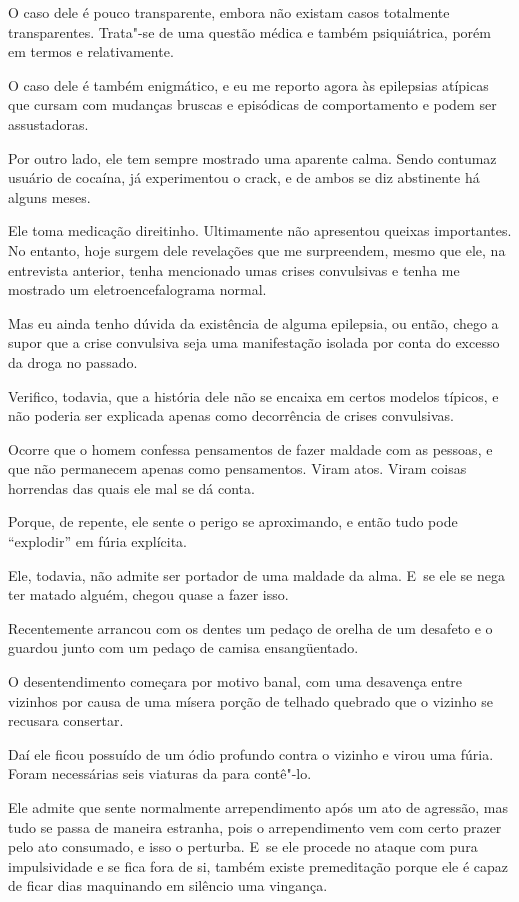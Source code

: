  

O caso dele é pouco transparente, embora não existam casos totalmente
transparentes. Trata"-se de uma questão médica e também psiquiátrica,
porém em termos e relativamente.

O caso dele é também enigmático, e eu me reporto agora às epilepsias
atípicas que cursam com mudanças bruscas e episódicas de comportamento e
podem ser assustadoras.

Por outro lado, ele tem sempre mostrado uma aparente calma. Sendo
contumaz usuário de cocaína, já experimentou o crack, e de ambos se diz
abstinente há alguns meses.

Ele toma medicação direitinho. Ultimamente não apresentou queixas
importantes. No entanto, hoje surgem dele revelações que me surpreendem,
mesmo que ele, na entrevista anterior, tenha mencionado umas crises
convulsivas e tenha me mostrado um eletroencefalograma normal.

Mas eu ainda tenho dúvida da existência de alguma epilepsia, ou então,
chego a supor que a crise convulsiva seja uma manifestação isolada por
conta do excesso da droga no passado.

Verifico, todavia, que a história dele não se encaixa em certos modelos
típicos, e não poderia ser explicada apenas como decorrência de crises
convulsivas.

Ocorre que o homem confessa pensamentos de fazer maldade com as pessoas,
e que não permanecem apenas como pensamentos. Viram atos. Viram coisas
horrendas das quais ele mal se dá conta.

Porque, de repente, ele sente o perigo se aproximando, e então tudo pode
``explodir'' em fúria explícita.

Ele, todavia, não admite ser portador de uma maldade da alma. E~se ele
se nega ter matado alguém, chegou quase a fazer isso.

Recentemente arrancou com os dentes um pedaço de orelha de um desafeto e
o guardou junto com um pedaço de camisa ensangüentado.

O desentendimento começara por motivo banal, com uma desavença entre
vizinhos por causa de uma mísera porção de telhado quebrado que o
vizinho se recusara consertar.

Daí ele ficou possuído de um ódio profundo contra o vizinho e virou uma
fúria. Foram necessárias seis viaturas da  para contê"-lo.

Ele admite que sente normalmente arrependimento após um ato de agressão,
mas tudo se passa de maneira estranha, pois o arrependimento vem com
certo prazer pelo ato consumado, e isso o perturba. E~se ele procede no
ataque com pura impulsividade e se fica fora de si, também existe
premeditação porque ele é capaz de ficar dias maquinando em silêncio uma
vingança.

